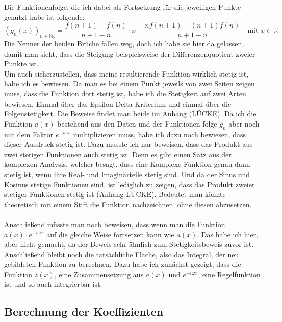 \documentclass[a4paper,12pt]{article}
\theoremstyle{definition}
\theoremstyle{remark}
\begin{document}
\\ \\ \\ \\ \\ \\ \\
Die Funktionenfolge, die ich dabei als Fortsetzung für die jeweiligen Punkte genutzt habe ist folgende:
$$\left(g_n(x)\right)_{n\in \mathbb{N}_0} = \frac{f(n+1) - f(n)}{n+1 -n } \cdot x + \frac{nf(n+1) - (n+1)f(n)}{n+1 -n} \quad \text{mit } x\in\mathbb{R} $$
Die Nenner der beiden Brüche fallen weg, doch ich habe sie hier da gelassen, damit man sieht, dass 
die Steigung beispielsweise der Differenzenquotient zweier Punkte ist. 
\\ 
Um auch sicherzustellen, dass meine resultierende Funktion wirklich stetig ist, habe ich es bewiesen. 
Da man es bei einem Punkt jeweils von zwei Seiten zeigen muss, dass die Funktion dort stetig ist, habe ich die 
Stetigkeit auf zwei Arten bewiesen. Einmal über das Epsilon-Delta-Kriterium und einmal über die Folgenstetigkeit. 
Die Beweise findet man beide im Anhang (LÜCKE). Da ich die Funktion $a(x)$ bestehend aus den Daten und der Funktionen folge $g_n$ 
aber noch mit dem Faktor $e^{-i\omega x}$ multiplizieren muss, habe ich dazu noch bewiesen, dass dieser Ausdruck stetig ist. 
Dazu musste ich nur beweisen, dass das Produkt aus zwei stetigen Funktionen auch stetig ist. Denn es gibt einen 
Satz aus der komplexen Analysis, welcher besagt, dass eine Komplexe Funktion genau dann stetig ist, 
wenn ihre Real- und Imaginärteile stetig sind. Und da der Sinus und Kosinus stetige Funktionen sind, 
ist lediglich zu zeigen, dass das Produkt zweier stetiger Funktionen stetig ist (Anhang LÜCKE). Bedeutet man könnte 
theoretisch mit einem Stift die Funktion nachzeichnen, ohne diesen abzusetzen. 
\\ \\
Anschließend müsste man noch beweisen, dass wenn man die Funktion $a(x)\cdot e^{-i\omega x}$ auf die gleiche Weise 
fortsetzen kann wie $a(x)$. Das habe ich hier, aber nicht gemacht, da der Beweis sehr ähnlich zum Stetigkeitsbeweis zuvor ist.
Anschließend bleibt noch die tatsächliche Fläche, also das Integral, der neu gebildeten Funktion zu berechnen. 
Dazu habe ich zunächst gezeigt, dass die Funktion $z(x)$, eine Zusammensetzung aus $a(x)$ und $e^{-i\omega x}$,
eine Regelfunktion ist und so auch integrierbar ist. 


\subsection{Berechnung der Koeffizienten}
\end{document}
